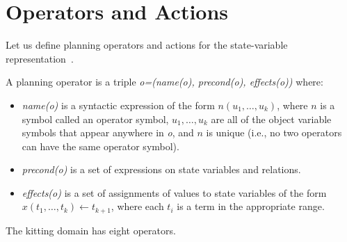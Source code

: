 \section{Operators and Actions}
\label{S:operators_and_actions}

Let us define planning operators and actions for the state-variable representation~\cite{NAU.2004}.

\begin{defn}A planning operator is a triple \textit{o=(name(o), precond(o), effects(o))}
where:
\begin{itemize}
\item \textit{name(o)} is a syntactic expression of the form $n(u_1,\dots,u_k)$, where $n$ is a symbol
called an operator symbol, $u_1,\dots,u_k$ are all of the object variable symbols that
appear anywhere in \textit{o}, and $n$ is unique (i.e., no two operators can have the
same operator symbol).
\item \textit{precond(o)} is a set of expressions on state variables and relations.
\item \textit{effects(o)} is a set of assignments of values to state variables of the form
$x(t_1,\dots,t_k)\leftarrow t_{k+1}$, where each $t_i$ is a term in the appropriate range.
\end{itemize}
\end{defn}

The kitting domain has eight operators.




